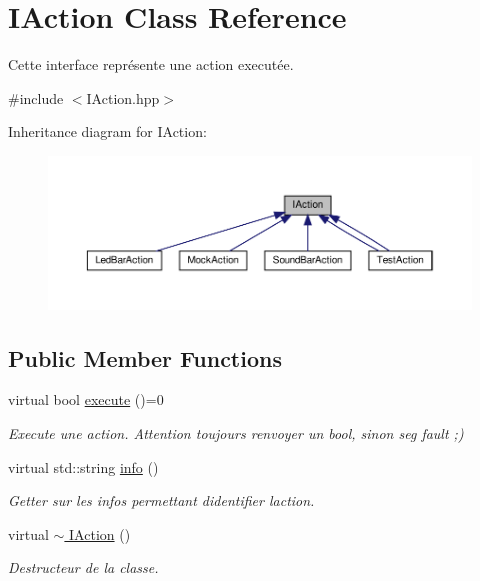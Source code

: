 \hypertarget{classIAction}{}\section{I\+Action Class Reference}
\label{classIAction}


Cette interface représente une action executée.  




{\ttfamily \#include $<$I\+Action.\+hpp$>$}



Inheritance diagram for I\+Action\+:
\nopagebreak
\begin{figure}[H]
\begin{center}
\leavevmode
\includegraphics[width=350pt]{classIAction__inherit__graph}
\end{center}
\end{figure}
\subsection*{Public Member Functions}
\begin{DoxyCompactItemize}
\item 
virtual bool \hyperlink{classIAction_a8fabb15178fbba329f1458326c1d7c94}{execute} ()=0
\begin{DoxyCompactList}\small\item\em Execute une action. Attention toujours renvoyer un bool, sinon seg fault ;) \end{DoxyCompactList}\item 
\mbox{\label{classIAction_a974d617d71344d64d2af7739a9e88d30}} 
virtual std\+::string \hyperlink{classIAction_a974d617d71344d64d2af7739a9e88d30}{info} ()
\begin{DoxyCompactList}\small\item\em Getter sur les infos permettant d\textquotesingle{}identifier l\textquotesingle{}action. \end{DoxyCompactList}\item 
\mbox{\label{classIAction_a4f8166b70afaa7a4c6093fc1975804c6}} 
virtual \hyperlink{classIAction_a4f8166b70afaa7a4c6093fc1975804c6}{$\sim$ I\+Action} ()
\begin{DoxyCompactList}\small\item\em Destructeur de la classe. \end{DoxyCompactList}\end{DoxyCompactItemize}
